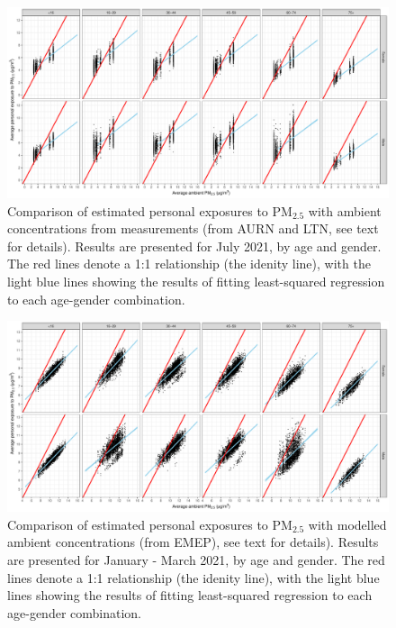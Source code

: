 \documentclass{article}
\begin{document}
\newpage 
\begin{figure}[!hbtp]
	\centering
	\includegraphics[width=\linewidth]{Figures/Fig1a}		
	\caption{Comparison of estimated personal exposures to PM$_{2.5}$ with ambient concentrations from measurements (from AURN and LTN, see text for details). Results are presented for July 2021, by age and gender. The red lines denote a 1:1 relationship (the idenity line), with the light blue lines showing the results of fitting least-squared regression to each age-gender combination.} \label{fig::Fig1a}
\end{figure}

\begin{figure}[!hbtp]
	\centering
	\includegraphics[width=\linewidth]{Figures/Fig1b}		
	\caption{Comparison of estimated personal exposures to PM$_{2.5}$ with modelled ambient concentrations (from EMEP), see text for details). Results are presented for January - March 2021, by age and gender. The red lines denote a 1:1 relationship (the idenity line), with the light blue lines showing the results of fitting least-squared regression to each age-gender combination.} \label{fig::Fig1b}
\end{figure}
\end{document}
